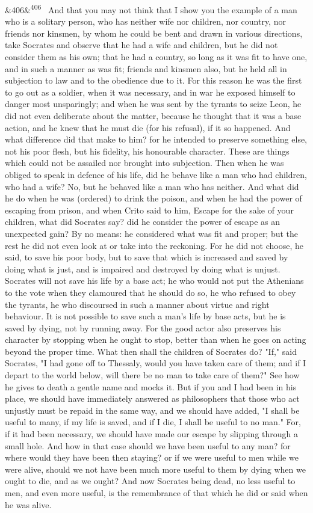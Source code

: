 \documentclass[12pt]{article}
\newcommand{\para}[1][]{\par\noindent\ifx&#1&\else\textsuperscript{\footnotesize #1}~\fi}
\begin{document}
\para[406] And that you may not think that I show you the example of a man who is a solitary person, who has neither wife nor children, nor country, nor friends nor kinsmen, by whom he could be bent and drawn in various directions, take Socrates and observe that he had a wife and children, but he did not consider them as his own; that he had a country, so long as it was fit to have one, and in such a manner as was fit; friends and kinsmen also, but he held all in subjection to law and to the obedience due to it. For this reason he was the first to go out as a soldier, when it was necessary, and in war he exposed himself to danger most unsparingly; and when he was sent by the tyrants to seize Leon, he did not even deliberate about the matter, because he thought that it was a base action, and he knew that he must die (for his refusal), if it so happened. And what difference did that make to him? for he intended to preserve something else, not his poor flesh, but his fidelity, his honourable character. These are things which could not be assailed nor brought into subjection. Then when he was obliged to speak in defence of his life, did he behave like a man who had children, who had a wife? No, but he behaved like a man who has neither. And what did he do when he was (ordered) to drink the poison, and when he had the power of escaping from prison, and when Crito said to him, Escape for the sake of your children, what did Socrates say? did he consider the power of escape as an unexpected gain? By no means: he considered what was fit and proper; but the rest he did not even look at or take into the reckoning. For he did not choose, he said, to save his poor body, but to save that which is increased and saved by doing what is just, and is impaired and destroyed by doing what is unjust. Socrates will not save his life by a base act; he who would not put the Athenians to the vote when they clamoured that he should do so, he who refused to obey the tyrants, he who discoursed in such a manner about virtue and right behaviour. It is not possible to save such a man's life by base acts, but he is saved by dying, not by running away. For the good actor also preserves his character by stopping when he ought to stop, better than when he goes on acting beyond the proper time. What then shall the children of Socrates do? "If," said Socrates, "I had gone off to Thessaly, would you have taken care of them; and if I depart to the world below, will there be no man to take care of them?" See how he gives to death a gentle name and mocks it. But if you and I had been in his place, we should have immediately answered as philosophers that those who act unjustly must be repaid in the same way, and we should have added, "I shall be useful to many, if my life is saved, and if I die, I shall be useful to no man." For, if it had been necessary, we should have made our escape by slipping through a small hole. And how in that case should we have been useful to any man? for where would they have been then staying? or if we were useful to men while we were alive, should we not have been much more useful to them by dying when we ought to die, and as we ought? And now Socrates being dead, no less useful to men, and even more useful, is the remembrance of that which he did or said when he was alive.
\end{document}
